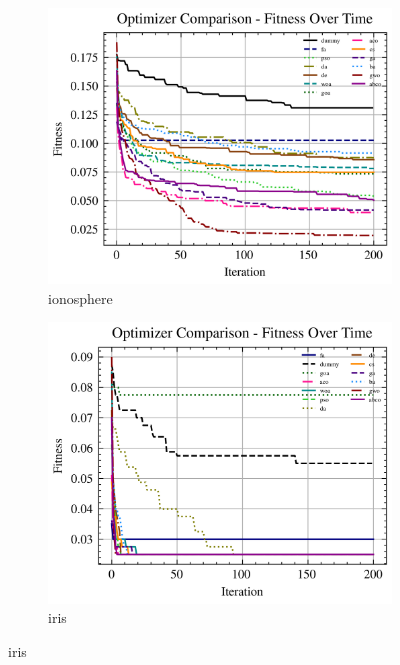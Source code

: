 \begin{figure}[htp]
    \begin{subfigure}[b]{0.45\textwidth}
        \includegraphics[width=\textwidth]{imagenes/fitness_charts/img/binary/ionosphere/optimizers_fitness_knn.png}
        \caption{ionosphere}
        \label{fig:convergencia_ionosphere_knn}
    \end{subfigure}
    \begin{subfigure}[b]{0.45\textwidth}
        \includegraphics[width=\textwidth]{imagenes/fitness_charts/img/binary/iris/optimizers_fitness_knn.png}
        \caption{iris}
        \label{fig:convergencia_iris_knn}
    \end{subfigure}


\end{figure}
